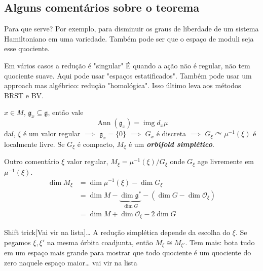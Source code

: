 \subsection{Alguns comentários sobre o teorema}

\begin{idea4}{Para que serve?}\leavevmode
Por exemplo, para disminuir os graus de liberdade de um sistema Hamiltoniano em uma variedade. Também pode ser que o espaço de moduli seja esse quociente.
\end{idea4}

\begin{idea5}{Em vários casos a redução é "singular"}\leavevmode
	É quando a ação não é regular, não tem quociente suave. Aqui pode usar "espaços estatificados". Também pode usar um approach mas algébrico: redução "homológica". Isso último leva aos métodos BRST e BV.
\end{idea5}

\begin{exercise}\leavevmode
	$x\in M$, $\mathfrak{g}_x\subseteq \mathfrak{g}$, então vale
	\[\operatorname{Ann}(\mathfrak{g}_x) =\operatorname{img} d_x\mu\]
	daí, $\xi$ é um valor regular $\implies $ $\mathfrak{g}_x=\{0\}$ $\implies $ $G_x$  é discreta $\implies $ $G_\xi\curvearrowright \mu^{-1}(\xi)$ é localmente livre. Se $G_\xi$ é compacto, $M_\xi$ é um \textit{\textbf{orbifold simplético}}.
\end{exercise}

\begin{idea1}{Outro comentário}\leavevmode
	$\xi$ valor regular, $M_\xi=\mu^{-1}(\xi)/G_\xi$ onde $G_\xi$ age livremente em $\mu^{-1}(\xi)$.
	\begin{align*}
		\dim M_\xi&=\dim \mu^{-1}(\xi)-\dim G_\xi\\
		&=\dim M-\underbrace{\dim \mathfrak{g}^*}_{\dim G}-(\dim G-\dim \mathcal{O}_\xi)\\
		&=\dim M+\dim \mathcal{O}_\xi-2\dim G
	\end{align*}
\end{idea1}


\begin{idea2}{Shift trick}[Vai vir na lista]…\leavevmode
	A redução simplética depende da escolha do $\xi$. Se pegamos $\xi,\xi'$ na mesma órbita coadjunta, então $M_\xi\cong M_{\xi'}$. Tem mais: bota tudo em um espaço mais grande para mostrar que todo quociente é um quociente do zero naquele espaço maior… vai vir na lista
\end{idea2}

